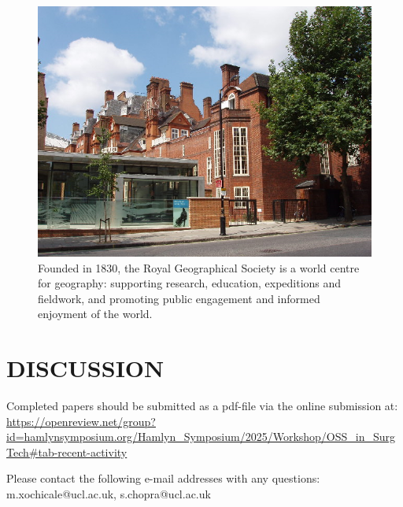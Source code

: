 \documentclass[a4paper, 10 pt, conference]{hsmrw}
\begin{document}
\begin{figure}[t]
\centering
\includegraphics[width=\columnwidth]{examplefig.png}
\caption{Founded in 1830, the Royal Geographical Society is a world centre for geography: supporting research, education, expeditions and fieldwork, and promoting public engagement and informed enjoyment of the world.}
\label{fig_example}
\end{figure}

\section*{DISCUSSION}
Completed papers should be submitted as a pdf-file via the online submission at: \url{https://openreview.net/group?id=hamlynsymposium.org/Hamlyn_Symposium/2025/Workshop/OSS_in_SurgTech#tab-recent-activity}

Please contact the following e-mail addresses with any questions: m.xochicale@ucl.ac.uk, s.chopra@ucl.ac.uk

\nocite{*}


\end{document}
